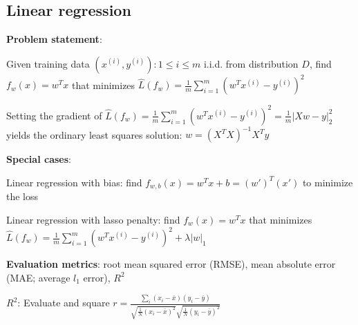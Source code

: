 \documentclass[letterpaper,fontsize=5pt]{scrartcl}
\renewenvironment{enumerate}[1]{\begin{compactenum}#1}{\end{compactenum}}
\theoremstyle{definition}
\newcommand{\abs}[1]{\lvert#1\rvert}
\begin{document}
\begin{multicols}{2}
\section{Linear regression}
	\begin{enumerate}
		\item \textbf{Problem statement}:
			\begin{enumerate}
				\item Given training data ${(x^{(i)},y^{(i)}):1 \leq i \leq m}$ i.i.d. from distribution $D$, find $f_w(x) = w^T x$ that minimizes $\hat{L}(f_w) = \frac{1}{m} \sum_{i=1}^m (w^T x^{(i)} - y^{(i)})^2$
				\item Setting the gradient of $\hat{L}(f_w) = \frac{1}{m} \sum_{i=1}^m (w^T x^{(i)} - y^{(i)})^2 = \frac{1}{m} \abs{Xw-y}_2^2$ yields the ordinary least squares solution: $w = (X^T X)^{-1} X^T y$
			\end{enumerate}
		\item \textbf{Special cases}:
			\begin{enumerate}
				\item Linear regression with bias: find $f_{w,b}(x) = w^T x + b = (w')^T (x')$ to minimize the loss
				\item Linear regression with lasso penalty: find $f_w(x) = w^T x$ that minimizes $\hat{L}(f_w) = \frac{1}{m} \sum_{i=1}^m (w^T x^{(i)} - y^{(i)})^2 + \lambda \abs{w}_1$
			\end{enumerate}
		\item \textbf{Evaluation metrics}: root mean squared error (RMSE), mean absolute error (MAE; average $l_1$ error), $R^2$
			\begin{enumerate}
				\item \textbf{$R^2$}: Evaluate and square $r = \frac{\sum_i (x_i - \bar{x})(y_i - \bar{y})} {\sqrt{\frac{1}{N}(x_i - \bar{x})^2} \sqrt{\frac{1}{N}(y_i - \bar{y})^2}}$
			\end{enumerate}
	\end{enumerate}

\end{multicols}
\end{document}
